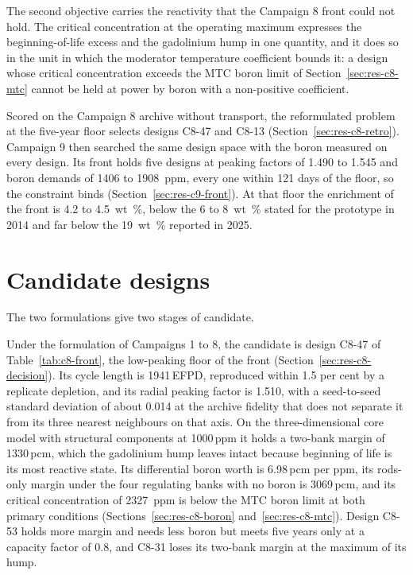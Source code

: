 The second objective carries the reactivity that the Campaign 8 front
could not hold. The critical concentration at the operating maximum
expresses the beginning-of-life excess and the gadolinium hump in one
quantity, and it does so in the unit in which the moderator
temperature coefficient bounds it: a design whose critical
concentration exceeds the MTC boron limit of
Section~\ref{sec:res-c8-mtc} cannot be held at power by boron with a
non-positive coefficient.

Scored on the Campaign 8 archive without transport, the reformulated
problem at the five-year floor selects designs C8-47 and C8-13
(Section~\ref{sec:res-c8-retro}). Campaign 9 then searched the same
design space with the boron measured on every design. Its front holds
five designs at peaking factors of 1.490 to 1.545 and boron demands of
1406 to \SI{1908}{ppm}, every one within 121 days of the floor, so the
constraint binds (Section~\ref{sec:res-c9-front}). At that floor the
enrichment of the front is 4.2 to \SI{4.5}{wt\%}, below the 6 to
\SI{8}{wt\%} stated for the prototype in 2014 and far below the
\SI{19}{wt\%} reported in 2025.

\section{Candidate designs}
\label{sec:concl-candidates}

The two formulations give two stages of candidate.

Under the formulation of Campaigns 1 to 8, the candidate is design C8-47
of Table~\ref{tab:c8-front}, the low-peaking floor of the front
(Section~\ref{sec:res-c8-decision}). Its cycle length is 1941\,EFPD,
reproduced within 1.5 per cent by a replicate depletion, and its
radial peaking factor is 1.510, with a seed-to-seed standard deviation
of about 0.014 at the archive fidelity that does not separate it from
its three nearest neighbours on that axis. On the three-dimensional
core model with structural components at 1000\,ppm it holds a two-bank margin of
1330\,pcm, which the gadolinium hump leaves intact because beginning of
life is its most reactive state. Its differential boron worth is
6.98\,pcm per ppm, its rods-only margin under the four regulating
banks with no boron is 3069\,pcm, and its critical concentration of
\SI{2327}{ppm} is below the MTC boron limit at both primary conditions
(Sections~\ref{sec:res-c8-boron}
and~\ref{sec:res-c8-mtc}). Design C8-53 holds more margin and needs less
boron but meets five years only at a capacity factor of 0.8, and C8-31
loses its two-bank margin at the maximum of its hump.

